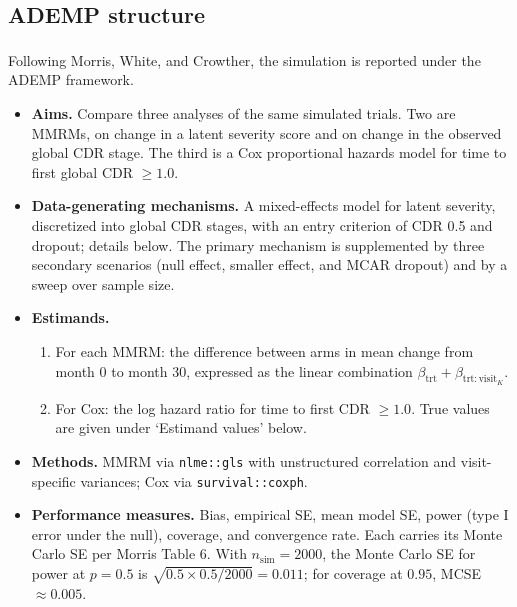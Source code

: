 \documentclass[
  11pt,
]{article}
\providecommand{\tightlist}{%
  \setlength{\itemsep}{0pt}\setlength{\parskip}{0pt}}
\begin{document}
\subsection{ADEMP structure}\label{ademp-structure}

Following Morris, White, and Crowther\textsuperscript{}, the
simulation is reported under the ADEMP framework.

\begin{itemize}
\tightlist
\item
  \textbf{Aims.} Compare three analyses of the same simulated
  trials. Two are MMRMs, on change in a latent severity
  score and on change in the observed global CDR stage.
  The third is a Cox proportional hazards model for time
  to first global CDR \(\geq 1.0\).
\item
  \textbf{Data-generating mechanisms.} A mixed-effects model for
  latent severity, discretized into global CDR stages, with
  an entry criterion of CDR 0.5 and dropout; details below.
  The primary mechanism is supplemented by three secondary
  scenarios (null effect, smaller effect, and MCAR dropout)
  and by a sweep over sample size.
\item
  \textbf{Estimands.}

  \begin{enumerate}
  \def\labelenumi{(\roman{enumi})}
  \tightlist
  \item
    For each MMRM: the difference between arms in mean
    change from month 0 to month 30, expressed as the linear
    combination \(\beta_{\mathrm{trt}} + \beta_{\mathrm{trt:visit}_K}\).
  \item
    For Cox: the log hazard ratio for time to first
    CDR \(\geq 1.0\). True values are given under `Estimand
    values' below.
  \end{enumerate}
\item
  \textbf{Methods.} MMRM via \texttt{nlme::gls} with unstructured
  correlation and visit-specific variances; Cox via
  \texttt{survival::coxph}.
\item
  \textbf{Performance measures.} Bias, empirical SE, mean model
  SE, power (type I error under the null), coverage, and
  convergence rate. Each carries its Monte Carlo SE per
  Morris Table 6. With \(n_{\mathrm{sim}} = 2000\), the Monte
  Carlo SE for power at \(p = 0.5\) is
  \(\sqrt{0.5 \times 0.5 / 2000} = 0.011\); for coverage at
  \(0.95\), MCSE \(\approx 0.005\).
\end{itemize}
\end{document}

